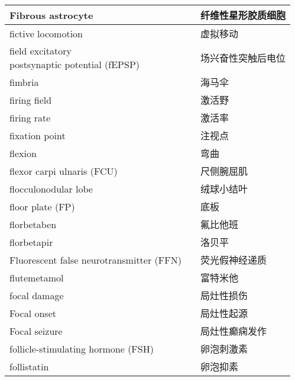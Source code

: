 \begin{longtable}{lll}
	\midrule
	Fibrous astrocyte     &&  纤维性星形胶质细胞  \\
	
	\midrule
	fictive locomotion     &&  虚拟移动  \\
	
	\midrule
	\makecell[l]{field excitatory \\postsynaptic potential (fEPSP)}     &&  场兴奋性突触后电位  \\
	
	\midrule
	fimbria     &&  海马伞  \\
	
	\midrule
	firing field     &&  激活野  \\
	
	\midrule
	firing rate     &&  激活率  \\
	
	\midrule
	fixation point     &&  注视点  \\
	
	\midrule
	flexion     &&  弯曲  \\
	
	\midrule
	flexor carpi ulnaris (FCU)     &&  尺侧腕屈肌  \\
	
	\midrule
	flocculonodular lobe     &&  绒球小结叶  \\
	
	\midrule
	floor plate (FP)    &&  底板  \\
	
	\midrule
	florbetaben    &&  氟比他班  \\
	
	\midrule
	florbetapir    &&  洛贝平  \\
	
	\midrule
	Fluorescent false neurotransmitter (FFN)    &&  荧光假神经递质  \\
	
	\midrule
	flutemetamol    &&  富特米他  \\
	
	\midrule
	focal damage     &&  局灶性损伤  \\
	
	\midrule
	Focal onset     &&  局灶性起源  \\
	
	\midrule
	Focal seizure     &&  局灶性癫痫发作  \\
	
	\midrule
	follicle-stimulating hormone (FSH)     &&  卵泡刺激素  \\
	
	\midrule
	follistatin     &&  卵泡抑素  \\
	

\end{longtable}

